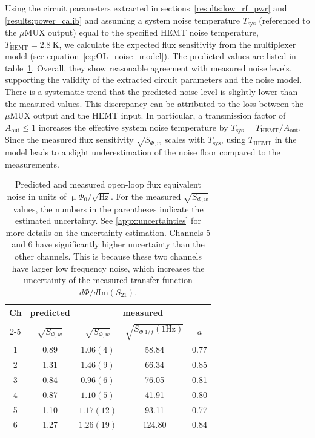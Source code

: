 \documentclass[
 prd,
 reprint,
 superscriptaddress,
 amsmath,amssymb,
 aps,
 floatfix,
]{revtex4-2}
\newcommand{\uMUX}{$\mu$MUX\xspace}
\newcommand{\uPhirtHz}{$\upmu \Phi_0/\sqrt{\text{Hz}}$\xspace}
\begin{document}
Using the circuit parameters extracted in sections~\ref{results:low_rf_pwr} and \ref{results:power_calib} and assuming a system noise temperature $T_{\text{sys}}$ (referenced to the \uMUX output) equal to the specified HEMT noise temperature, $T_{\text{HEMT}} = 2.8~\mathrm{K}$, we calculate the expected flux sensitivity from the multiplexer model (see equation~\eqref{eq:OL_noise_model}). The predicted values are listed in table~\ref{tab:open_loop_noise}. Overall, they show reasonable agreement with measured noise levels, supporting the validity of the extracted circuit parameters and the noise model. There is a systematic trend that the predicted noise level is slightly lower than the measured values. This discrepancy can be attributed to the loss between the \uMUX output and the HEMT input. In particular, a transmission factor of $A_{\text{out}} \le 1$ increases the effective system noise temperature by $T_{\text{sys}} = T_{\text{HEMT}}/A_{\text{out}}$. Since the measured flux sensitivity $\sqrt{S_{\Phi,w}}$ scales with $T_{\text{sys}}$, using $T_{\text{HEMT}}$ in the model leads to a slight underestimation of the noise floor compared to the measurements.


\begin{table}[htb]
    \centering
    \begin{tabular}{c c ccc}
    \hline
         \multirow{2}{*}{Ch} & predicted & \multicolumn{3}{c}{measured} \\
         \cline{2-5}
         & $\sqrt{S_{\Phi,w}}$ & $\sqrt{S_{\Phi,w}}$ & \small{$\sqrt{S_{\Phi_, 1/f} (1 \text{Hz})}$} & $a$ \\
    \hline
    1 & 0.89 & $1.06 (4)$ & 58.84 & 0.77\\
    2 & 1.31 & $1.46 (9)$ & 66.34 & 0.85\\
    3 & 0.84 & $0.96 (6)$ & 76.05 & 0.81\\
    4 & 0.87 & $1.10 (5)$ & 41.91 & 0.80\\
    5 & 1.10 & $1.17 (12)$ & 93.11 & 0.77\\
    6 & 1.27 & $1.26 (19)$ & 124.80 & 0.84\\
    \hline
    \end{tabular}
    \caption{Predicted and measured open-loop flux equivalent noise in units of \uPhirtHz. For the measured $\sqrt{S_{\Phi,w}}$ values, the numbers in the parentheses indicate the estimated uncertainty. See \ref{appx:uncertainties} for more details on the uncertainty estimation. Channels 5 and 6 have significantly higher uncertainty than the other channels. This is because these two channels have larger low frequency noise, which increases the uncertainty of the measured transfer function $d\Phi/d\mathrm{Im}(S_{21})$.}
    \label{tab:open_loop_noise}
\end{table}
\end{document}

